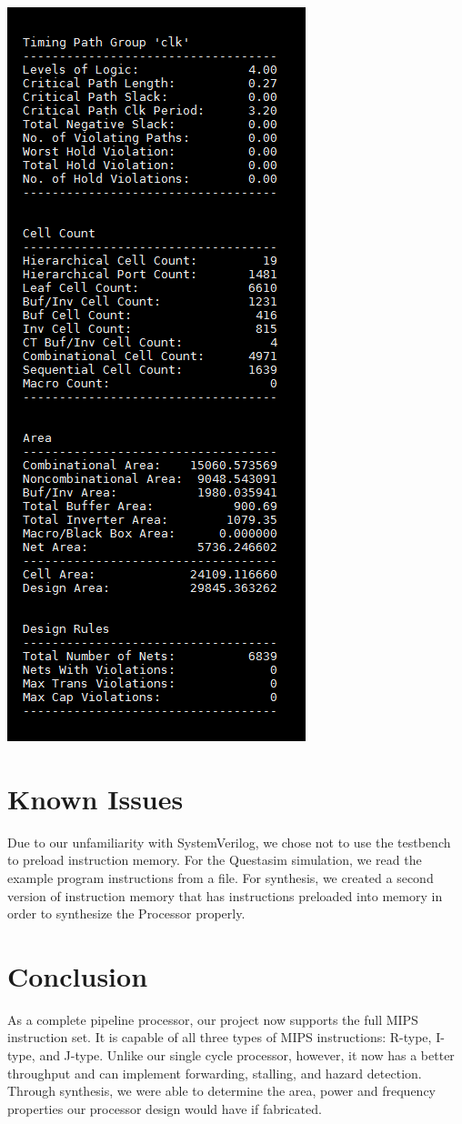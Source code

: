 \documentclass{article}
\begin{document}
\includegraphics[scale=.5]{reportQor.png}\\

\section{Known Issues} 
Due to our unfamiliarity with SystemVerilog, we chose not to use the testbench to preload instruction memory. For the Questasim simulation, we read the example program instructions from a file.  For synthesis, we created a second version of instruction memory that has instructions preloaded into memory in order to synthesize the Processor properly.
\\

\section{Conclusion}

As a complete pipeline processor, our project now supports the full MIPS instruction set. It is capable of all three types of MIPS instructions: R-type, I-type, and J-type. Unlike our single cycle processor, however, it now has a better throughput and can implement forwarding, stalling, and hazard detection. Through synthesis, we were able to determine the area, power and frequency properties our processor design would have if fabricated.
\end{document}
